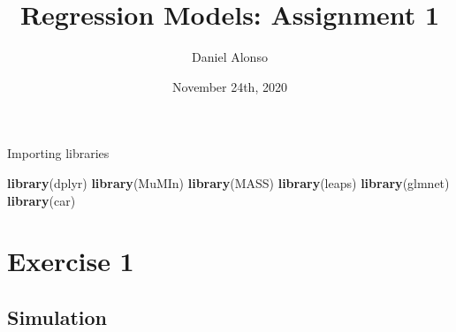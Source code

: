 \documentclass[]{article}
\title{Regression Models: Assignment 1}
\author{Daniel Alonso}
\date{November 24th, 2020}
\newenvironment{Shaded}{\begin{snugshade}}{\end{snugshade}}
\newcommand{\KeywordTok}[1]{\textcolor[rgb]{0.13,0.29,0.53}{\textbf{#1}}}
\newcommand{\NormalTok}[1]{#1}
\begin{document}
\maketitle

Importing libraries

\begin{Shaded}
\begin{Highlighting}[]
\KeywordTok{library}\NormalTok{(dplyr)}
\KeywordTok{library}\NormalTok{(MuMIn)}
\KeywordTok{library}\NormalTok{(MASS)}
\KeywordTok{library}\NormalTok{(leaps)}
\KeywordTok{library}\NormalTok{(glmnet)}
\KeywordTok{library}\NormalTok{(car)}
\end{Highlighting}
\end{Shaded}

\hypertarget{exercise-1}{%
\section{Exercise 1}\label{exercise-1}}

\hypertarget{simulation}{%
\subsection{Simulation}\label{simulation}}
\end{document}
